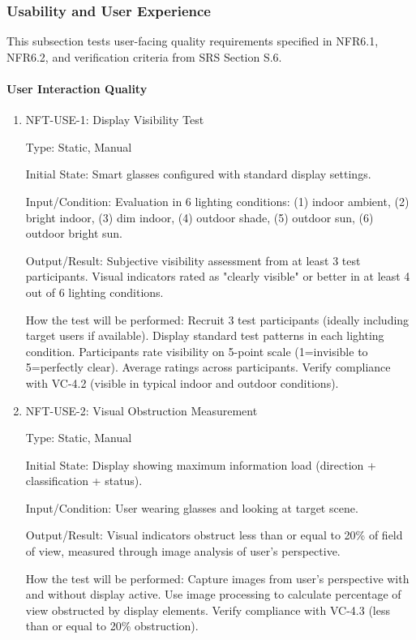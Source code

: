 \documentclass[12pt, titlepage]{article}
\begin{document}
\subsubsection{Usability and User Experience}

This subsection tests user-facing quality requirements specified in NFR6.1,
NFR6.2, and verification criteria from SRS Section S.6.

\paragraph{User Interaction Quality}

\begin{enumerate}

\item{NFT-USE-1: Display Visibility Test\\}

Type: Static, Manual

Initial State: Smart glasses configured with standard display settings.

Input/Condition: Evaluation in 6 lighting conditions: (1) indoor ambient, (2)
bright indoor, (3) dim indoor, (4) outdoor shade, (5) outdoor sun, (6) outdoor
bright sun.

Output/Result: Subjective visibility assessment from at least 3 test
participants. Visual indicators rated as "clearly visible" or better in at least
4 out of 6 lighting conditions.

How the test will be performed: Recruit 3 test participants (ideally including
target users if available). Display standard test patterns in each lighting
condition. Participants rate visibility on 5-point scale (1=invisible to
5=perfectly clear). Average ratings across participants. Verify compliance with
VC-4.2 (visible in typical indoor and outdoor conditions).

\item{NFT-USE-2: Visual Obstruction Measurement\\}

Type: Static, Manual

Initial State: Display showing maximum information load (direction +
classification + status).

Input/Condition: User wearing glasses and looking at target scene.

Output/Result: Visual indicators obstruct less than or equal to 20\% of field of view, measured
through image analysis of user's perspective.

How the test will be performed: Capture images from user's perspective with and
without display active. Use image processing to calculate percentage of view
obstructed by display elements. Verify compliance with VC-4.3 (less than or equal to 20\%
obstruction).


\end{enumerate}
\end{document}
